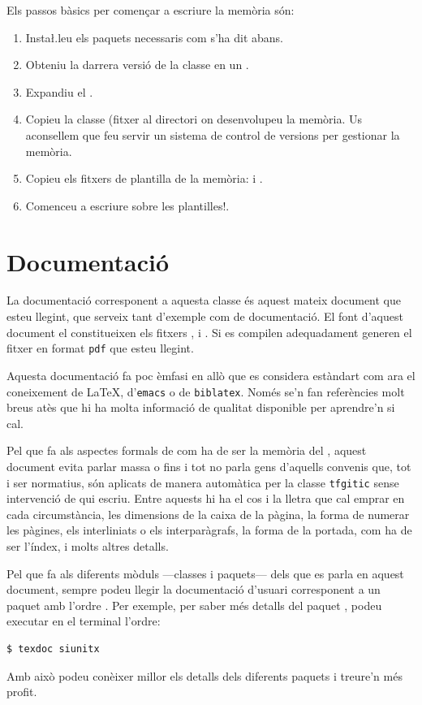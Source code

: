 \documentclass{tfgitic}[2024/07/01]
\begin{document}
Els passos bàsics per començar a escriure la memòria són:
\begin{enumerate}
\item Insta\l.leu els paquets necessaris com s'ha dit abans.
\item Obteniu la darrera versió de la classe en un 
  .
\item Expandiu el .
\item Copieu la classe (fitxer  al directori on
  desenvolupeu la memòria. Us aconsellem que feu servir un sistema de
  control de versions per gestionar la memòria.
\item Copieu els fitxers de plantilla de la memòria:  i
  .
\item Comenceu a escriure sobre les plantilles!.
\end{enumerate}

\section{Documentació}
\label{sec:documentacio}

La documentació corresponent a aquesta classe és aquest mateix
document que esteu llegint, que serveix tant d'exemple com de
documentació. El font d'aquest document el constitueixen els fitxers
,  i . Si
es compilen adequadament generen el fitxer en format \texttt{pdf} que
esteu llegint.

Aquesta documentació fa poc èmfasi en allò que es considera estàndart
com ara el coneixement de \LaTeX{}, d'\texttt{emacs} o de
\texttt{biblatex}. Només se'n fan referències molt breus atès que hi
ha molta informació de qualitat disponible per aprendre'n si cal.

Pel que fa als aspectes formals de com ha de ser la memòria del
, aquest document evita parlar massa o fins i tot no parla
gens d'aquells convenis que, tot i ser normatius, són aplicats de
manera automàtica per la classe \texttt{tfgitic} sense intervenció de
qui escriu. Entre aquests hi ha el cos i la lletra que cal emprar en
cada circumstància, les dimensions de la caixa de la pàgina, la forma
de numerar les pàgines, els interliniats o els interparàgrafs, la
forma de la portada, com ha de ser l'índex, i molts altres
detalls.

Pel que fa als diferents mòduls ---classes i paquets--- dels que es
parla en aquest document, sempre podeu llegir la documentació d'usuari
corresponent a un paquet amb l'ordre . Per exemple, per
saber més detalls del paquet , podeu executar en el
terminal l'ordre:
\begin{verbatim}
$ texdoc siunitx
\end{verbatim}
Amb això podeu conèixer millor els detalls dels diferents paquets i
treure'n més profit.
\end{document}
